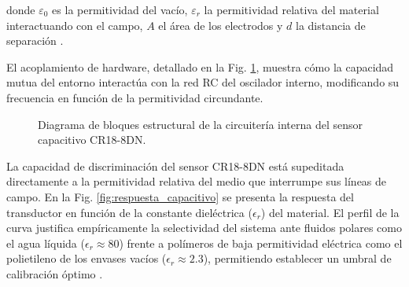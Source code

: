 \documentclass[conference]{IEEEtran}
\begin{document}
donde $\varepsilon_0$ es la permitividad del vacío, $\varepsilon_r$ la permitividad relativa del material interactuando con el campo, $A$ el área de los electrodos y $d$ la distancia de separación \cite{sensores_6}. 

El acoplamiento de hardware, detallado en la Fig. \ref{fig:bloques_capacitivo}, muestra cómo la capacidad mutua del entorno interactúa con la red RC del oscilador interno, modificando su frecuencia en función de la permitividad circundante.

\begin{figure}[htbp]
    \centering
    \caption{Diagrama de bloques estructural de la circuitería interna del sensor capacitivo CR18-8DN.}
    \label{fig:bloques_capacitivo}
\end{figure}

La capacidad de discriminación del sensor CR18-8DN está supeditada directamente a la permitividad relativa del medio que interrumpe sus líneas de campo. En la Fig. \ref{fig:respuesta_capacitivo} se presenta la respuesta del transductor en función de la constante dieléctrica ($\epsilon_r$) del material. El perfil de la curva justifica empíricamente la selectividad del sistema ante fluidos polares como el agua líquida ($\epsilon_r \approx 80$) frente a polímeros de baja permitividad eléctrica como el polietileno de los envases vacíos ($\epsilon_r \approx 2.3$), permitiendo establecer un umbral de calibración óptimo \cite{sensores_18, sensores_20}.
\end{document}
